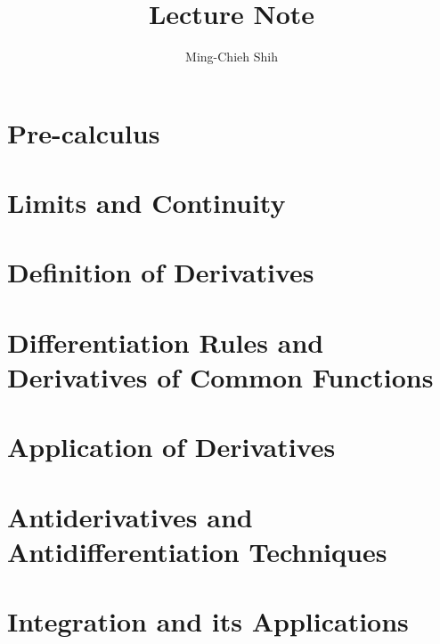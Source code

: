 \documentclass{easyclass}
\begin{document}
\begin{titlepage}
    \title{Lecture Note}
    \author{Ming-Chieh Shih}
    \maketitle
\end{titlepage}

\tableofcontents

\chapter{Pre-calculus}


\chapter{Limits and Continuity}


\chapter{Definition of Derivatives}


\chapter{Differentiation Rules and Derivatives of Common Functions}


\chapter{Application of Derivatives}


\chapter{Antiderivatives and Antidifferentiation Techniques}


\chapter{Integration and its Applications}


%
\end{document}
